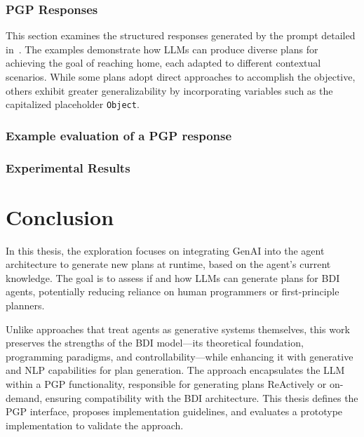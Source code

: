 \documentclass[12pt,a4paper,openright,twoside]{book}
\begin{document}

\subsection{\acs{PGP} Responses}\label{app:response}

This section examines the structured responses generated by the prompt detailed in~. 
%
The examples demonstrate how \acp{LLM} can produce diverse plans for achieving the goal of reaching home, each adapted to different contextual scenarios.
%
While some plans adopt direct approaches to accomplish the objective, others exhibit greater generalizability by incorporating variables such as the capitalized placeholder \texttt{Object}.

\subsection{Example evaluation of a PGP response}\label{app:response}

\subsection{Experimental Results}

\chapter{Conclusion}\label{sec:conclusion}

In this thesis, the exploration focuses on integrating \ac{GenAI} into the \agentspeak{} agent architecture to generate new plans at runtime, based on the agent's current knowledge.
%
The goal is to assess if and how \acp{LLM} can generate plans for \ac{BDI} agents, potentially reducing reliance on human programmers or first-principle planners.

Unlike approaches that treat agents as generative systems themselves, this work preserves the strengths of the \ac{BDI} model---its theoretical foundation, programming paradigms, and controllability---while enhancing it with generative and \ac{NLP} capabilities for plan generation.
%
The approach encapsulates the \ac{LLM} within a \ac{PGP} functionality, responsible for generating plans \ac{ReAct}ively or on-demand, ensuring compatibility with the \ac{BDI} architecture.
%
This thesis defines the \ac{PGP} interface, proposes implementation guidelines, and evaluates a prototype implementation to validate the approach.
\end{document}
